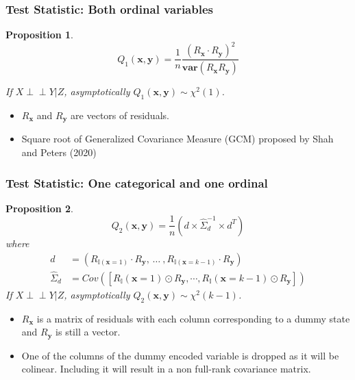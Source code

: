 \documentclass{beamer}
\def\ci{\perp\!\!\!\!\!\perp}
\newtheorem{proposition}{Proposition}
\begin{document}
\begin{frame}
	\frametitle{Test Statistic: Both ordinal variables}
	\begin{proposition}
	$$ Q_1(\bm{x}, \bm{y}) = \frac{1}{n} \frac{(R_{\bm{x}} \cdot R_{\bm{y}})^2}{\bm{var}(R_{\bm{x}} R_{\bm{y}})} $$
		\begin{center} If $ X \ci Y | Z $, asymptotically $ Q_1(\bm{x}, \bm{y}) \sim \chi^2(1) $. \end{center}
	\end{proposition}
	\begin{center}
		\begin{itemize}
			\item $ R_{\bm{x}} $ and $ R_{\bm{y}} $ are vectors of residuals.
			\item Square root of Generalized Covariance Measure (GCM) proposed by Shah and Peters (2020)
		\end{itemize}
	\end{center}
\end{frame}

\begin{frame}
	\frametitle{Test Statistic: One categorical and one ordinal}
	\begin{proposition}

		$$ Q_2(\bm{x}, \bm{y}) = \frac{1}{n} (d \times \hat{\Sigma}_d^{-1} \times d^T) $$
	where
	\begin{equation*}
		\begin{split}
		d &= (R_{\mathbb{I}(\mathbf{x}=1)} \cdot R_{\mathbf{y}}, \, \ldots \ , R_{\mathbb{I}(\mathbf{x}=k-1)} \cdot R_{\mathbf{y}}) \\ 
		\hat{\Sigma}_d &= Cov([R_\mathbb{I}(\mathbf{x}=1) \odot R_\mathbf{y}, \cdots, R_\mathbb{I}(\mathbf{x}=k-1) \odot R_\mathbf{y}])
		\end{split}
	\end{equation*}
		If $ X \ci Y | Z $, asymptotically $ Q_2(\bm{x}, \bm{y}) \sim \chi^2(k-1) $.
	\end{proposition}
	\begin{center}
		\begin{itemize}
			\item $ R_{\bm{x}} $ is a matrix of residuals with each column corresponding to a dummy state and $ R_{\bm{y}} $ is still a vector.
			\item One of the columns of the dummy encoded variable
				is dropped as it will be colinear. Including it will
				result in a non full-rank covariance matrix.
		\end{itemize}
	\end{center}
\end{frame}
\end{document}
